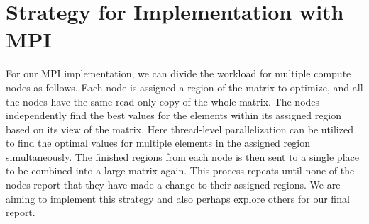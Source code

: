 \documentclass{article}
\begin{document}
\section{Strategy for Implementation with MPI}
For our MPI implementation, we can divide the workload for multiple compute nodes as follows. Each node is assigned a region of the matrix to optimize, and all the nodes have the same read-only copy of the whole matrix. The nodes independently find the best values for the elements within its assigned region based on its view of the matrix. Here thread-level parallelization can be utilized to find the optimal values for multiple elements in the assigned region simultaneously. The finished regions from each node is then sent to a single place to be combined into a large matrix again. This process repeats until none of the nodes report that they have made a change to their assigned regions. We are aiming to implement this strategy and also perhaps explore others for our final report.
\end{document}

